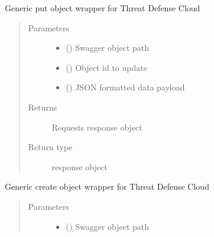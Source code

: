 \documentclass[letterpaper,10pt,english]{sphinxmanual}
\begin{document}
\begin{fulllineitems}
\begin{fulllineitems}
\label{\detokenize{b1tdc-class:bloxone.b1tdc.put}}
\sphinxAtStartPar
Generic put object wrapper for Threat Defense Cloud
\begin{quote}\begin{description}
\item[{Parameters}] \leavevmode\begin{itemize}
\item {} 
\sphinxAtStartPar
{} () \textendash{} Swagger object path

\item {} 
\sphinxAtStartPar
{} () \textendash{} Object id to update

\item {} 
\sphinxAtStartPar
{} () \textendash{} JSON formatted data payload

\end{itemize}

\item[{Returns}] \leavevmode
\sphinxAtStartPar
Requests response object

\item[{Return type}] \leavevmode
\sphinxAtStartPar
response object

\end{description}\end{quote}

\end{fulllineitems}


\begin{fulllineitems}
\label{\detokenize{b1tdc-class:bloxone.b1tdc.update}}
\sphinxAtStartPar
Generic create object wrapper for Threat Defense Cloud
\begin{quote}\begin{description}
\item[{Parameters}] \leavevmode\begin{itemize}
\item {} 
\sphinxAtStartPar
{} () \textendash{} Swagger object path


\end{itemize}
\end{description}
\end{quote}
\end{fulllineitems}
\end{fulllineitems}
\end{document}
